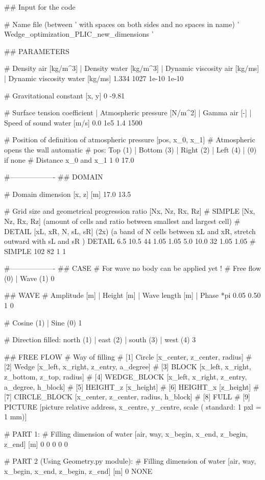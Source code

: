 ## Input for the code

# Name file (between ' with spaces on both sides and no spaces in name)
' Wedge_optimization_PLIC_new_dimensions '

## PARAMETERS

# Density air [kg/m^3] | Density water [kg/m^3] | Dynamic viscosity air [kg/ms] | Dynamic viscosity water [kg/ms]
1.334 1027 1e-10 1e-10

# Gravitational constant [x, y]
0 -9.81

# Surface tension coefficient | Atmospheric pressure [N/m^2] | Gamma air [-]	| Speed of sound water [m/s]
0.0 	1e5 	1.4		1500

# Position of definition of atmospheric pressure [pos, x_0, x_1]
# Atmospheric opens the wall automatic
# pos: Top (1)	| Bottom (3)	| Right (2)		| Left (4) | (0) if none
# Distance x_0 and x_1
1 0 17.0

#-------------------
## DOMAIN

# Domain dimension [x, z] [m]
17.0 13.5

# Grid size and geometrical progression ratio [Nx, Nz, Rx, Rz]
# SIMPLE [Nx, Nz, Rx, Rz] (amount of cells and ratio between smallest and largest cell)
# DETAIL [xL, xR, N, sL, sR] (2x) (a band of N cells between xL and xR, stretch outward with sL and sR )
DETAIL 6.5 10.5 44 1.05 1.05 5.0 10.0 32 1.05 1.05
# SIMPLE 102 82 1 1

#-------------------
## CASE
# For wave no body can be applied yet !
# Free flow (0)	| Wave (1)
0

## WAVE
# Amplitude [m] | Height [m]	| Wave length [m]	| Phase *pi
0.05 	0.50		1		0

# Cosine (1)	| Sine (0)
1

# Direction filled: north (1)	| east (2)	|	south (3)	| west (4)
3

## FREE FLOW
# Way of filling
# [1] Circle        [x_center, z_center, radius]
# [2] Wedge         [x_left, x_right, z_entry, a_degree]
# [3] BLOCK 		[x_left, x_right, z_bottom, z_top, radius]
# [4] WEDGE_BLOCK   [x_left, x_right, z_entry, a_degree, h_block]
# [5] HEIGHT_z      [x_height]
# [6] HEIGHT_x      [z_height]
# [7] CIRCLE_BLOCK  [x_center, z_center, radius, h_block]
# [8] FULL
# [9] PICTURE		[picture relative address, x_centre, y_centre, scale ( standard: 1 pxl = 1 mm)]

# PART 1:
# Filling dimension of water [air, way, x_begin, x_end, z_begin, z_end] [m]
0 0 0 0 0

# PART 2 (Using Geometry.py module):
# Filling dimension of water [air, way, x_begin, x_end, z_begin, z_end] [m]
0 NONE

